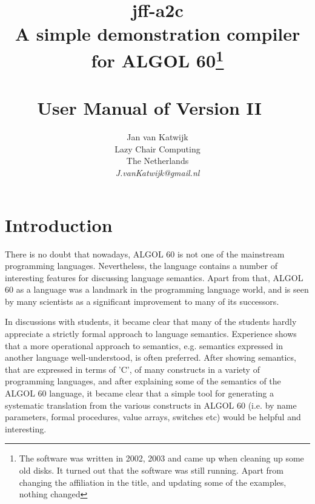 \documentclass[11pt]{article}
\begin{document}
\title{{\huge jff-a2c}\\
{\normalsize A simple demonstration compiler for ALGOL 60\footnote{The software was written in 2002, 2003 and came up when cleaning up some old disks. It turned out that the software was still running. Apart from changing the affiliation
in the title, and updating some of the examples, nothing changed}}\\
\ \\
User Manual of Version II
\ \\
}
\author{Jan van Katwijk\\
Lazy Chair Computing\\
The Netherlands\\
{\em J.vanKatwijk@gmail.nl}}
\maketitle

\section{Introduction}
There is no doubt that nowadays, ALGOL 60 is
not one of the mainstream programming languages.
Nevertheless, the language contains a number of interesting features for
discussing language semantics. Apart from that, ALGOL 60 as a language was
a landmark in the programming language world, and is seen by 
many scientists as a significant improvement to many of its successors.

In discussions with students, it became clear that many
of the students hardly appreciate
a strictly formal approach to language semantics.
Experience shows that a more operational approach to semantics, e.g. semantics
expressed
in another language well-understood,
is often preferred. 
After showing semantics, that are expressed in terms of 'C', of many
constructs in a variety of programming languages, 
and after explaining some of the semantics of the ALGOL 60 language,
it became clear that a simple tool for generating a systematic translation
from the various constructs in ALGOL 60 (i.e. by name parameters,
formal procedures, value arrays, switches etc) would be helpful and
interesting.
\end{document}
